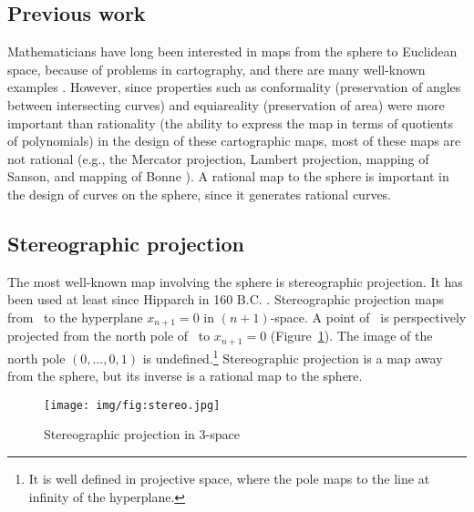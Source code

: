 \documentclass[12pt]{article}
\begin{document}
\clearpage

\subsection{Previous work}

Mathematicians have long been interested in maps from the sphere to Euclidean space,
because of problems in cartography,
and there are many well-known examples \cite{kreyszig59}.
However, since properties such as conformality (preservation of angles between 
intersecting curves) and equiareality (preservation of area) were more important than
rationality (the ability to express the map in terms of quotients of polynomials)
in the design of these cartographic maps, most of these maps
are not rational (e.g., the Mercator projection, Lambert projection,
mapping of Sanson, and mapping of Bonne \cite{kreyszig59}).
A rational map to the sphere is important in the design of curves on the
sphere, since it generates rational curves.

\clearpage

\subsection{Stereographic projection}
\label{sec:stereo}

The most well-known map involving the sphere is stereographic projection.
It has been used at least since Hipparch in 160 B.C. \cite{kreyszig59}. %
Stereographic projection maps from \ to the hyperplane $x_{n+1}=0$ in $(n+1)$-space.
A point of \ is perspectively projected from 
the north pole of \ to $x_{n+1}=0$  %
(Figure~\ref{fig:stereo}).
The image of the north pole $(0,\ldots,0,1)$ is undefined.\footnote{It is well defined
  in projective space, where the pole maps to the line at infinity of the hyperplane.}
Stereographic projection is a map away from the sphere, 
but its inverse is a rational map to the sphere.

\begin{figure}[ht]
\begin{center}
\texttt{[image: img/fig:stereo.jpg]}
\end{center}
\caption{Stereographic projection in 3-space}
\label{fig:stereo}
\end{figure}
\end{document}

